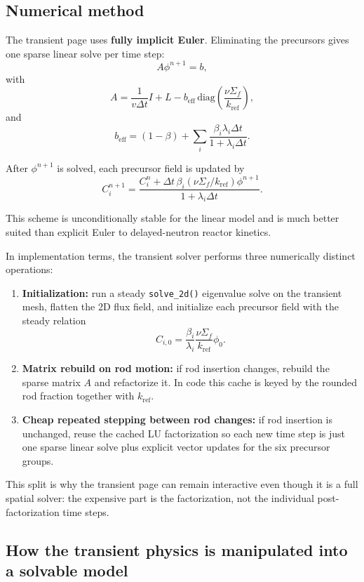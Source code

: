 \documentclass[11pt]{article}
\begin{document}
\subsection{Numerical method}

The transient page uses \textbf{fully implicit Euler}.  Eliminating the
precursors gives one sparse linear solve per time step:
\[
A\phi^{n+1} = b,
\]
with
\[
A = \frac{1}{v\Delta t}I + L
- b_{\mathrm{eff}}\,\mathrm{diag}\!\left(\frac{\nu\Sigma_f}{k_{\mathrm{ref}}}\right),
\]
and
\[
b_{\mathrm{eff}}
=
(1-\beta) + \sum_i \frac{\beta_i \lambda_i \Delta t}{1+\lambda_i \Delta t}.
\]

After $\phi^{n+1}$ is solved, each precursor field is updated by
\[
C_i^{n+1}
=
\frac{C_i^n + \Delta t\,\beta_i(\nu\Sigma_f/k_{\mathrm{ref}})\phi^{n+1}}
{1+\lambda_i \Delta t}.
\]

This scheme is unconditionally stable for the linear model and is much better
suited than explicit Euler to delayed-neutron reactor kinetics.

In implementation terms, the transient solver performs three numerically distinct
operations:
\begin{enumerate}
  \item \textbf{Initialization:} run a steady \texttt{solve\_2d()} eigenvalue
        solve on the transient mesh, flatten the 2D flux field, and initialize
        each precursor field with the steady relation
        \[
        C_{i,0} = \frac{\beta_i}{\lambda_i}\frac{\nu\Sigma_f}{k_{\mathrm{ref}}}\phi_0.
        \]
  \item \textbf{Matrix rebuild on rod motion:} if rod insertion changes, rebuild
        the sparse matrix $A$ and refactorize it.  In code this cache is keyed by
        the rounded rod fraction together with $k_{\mathrm{ref}}$.
  \item \textbf{Cheap repeated stepping between rod changes:} if rod insertion is
        unchanged, reuse the cached LU factorization so each new time step is
        just one sparse linear solve plus explicit vector updates for the six
        precursor groups.
\end{enumerate}

This split is why the transient page can remain interactive even though it is a
full spatial solver: the expensive part is the factorization, not the individual
post-factorization time steps.

\subsection{How the transient physics is manipulated into a solvable model}
\end{document}
